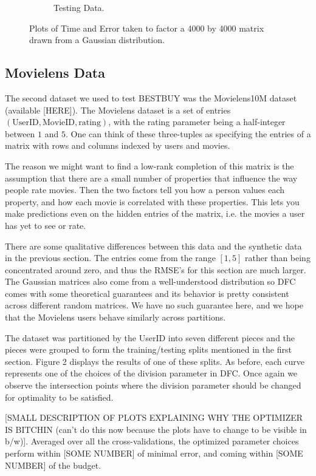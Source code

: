 \begin{figure}
\begin{subfigure}[b]{.45\textwidth}
\begin{center}
		\caption{Testing Data.}
\end{center}
	\end{subfigure}
\hfill
	\caption{Plots of Time and Error taken to factor a 4000 by 4000 matrix drawn from a Gaussian distribution.}	
\end{figure}

\subsection{Movielens Data}
The second dataset we used to test BESTBUY was the Movielens10M dataset (available [HERE]). The Movielens dataset is a set of entries $(\text{UserID},\text{MovieID},\text{rating})$, with the rating parameter being a half-integer between $1$ and $5$. One can think of these three-tuples as specifying the entries of a matrix with rows and columns indexed by users and movies. 

The reason we might want to find a low-rank completion of this matrix is the assumption that there are a small number of properties that influence the way people rate movies. Then the two factors tell you how a person values each property, and how each movie is correlated with these properties. This lets you make predictions even on the hidden entries of the matrix, i.e. the movies a user has yet to see or rate. 

There are some qualitative differences between this data and the synthetic data in the previous section. The entries come from the range $[1,5]$ rather than being concentrated around zero, and thus the RMSE's for this section are much larger. The Gaussian matrices also come from a well-understood distribution so DFC comes with some theoretical guarantees and its behavior is pretty consistent across different random matrices. We have no such guarantee here, and we hope that the Movielens users behave similarly across partitions. 

The dataset was partitioned by the UserID into seven different pieces and the pieces were grouped to form the training/testing splits mentioned in the first section. Figure 2 displays the results of one of these splits. As before, each curve represents one of the choices of the division parameter in DFC. Once again we observe the intersection points where the division parameter should be changed for optimality to be satisfied. 

[SMALL DESCRIPTION OF PLOTS EXPLAINING WHY THE OPTIMIZER IS BITCHIN (can't do this now because the plots have to change to be visible in b/w)]. Averaged over all the cross-validations, the optimized parameter choices perform within [SOME NUMBER] of minimal error, and coming within [SOME NUMBER] of the budget.

